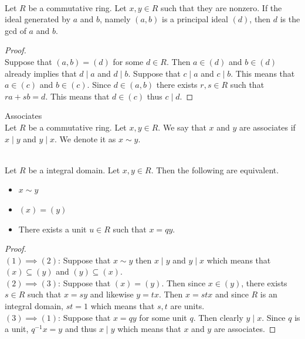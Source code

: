 \documentclass[a4paper]{article}
\begin{document}
\begin{prp}{}{}\\
Let $R$ be a commutative ring. Let $x,y\in R$ such that they are nonzero. If the ideal generated by $a$ and $b$, namely $(a,b)$ is a principal ideal $(d)$, then $d$ is the gcd of $a$ and $b$. 
\begin{proof}\\
Suppose that $(a,b)=(d)$ for some $d\in R$. Then $a\in(d)$ and $b\in(d)$ already implies that $d\;|\;a$ and $d\;|\;b$. Suppose that $c\;|\;a$ and $c\;|\;b$. This means that $a\in(c)$ and $b\in(c)$. Since $d\in(a,b)$ there exists $r,s\in R$ such that $ra+sb=d$. This means that $d\in(c)$ thus $c\;|\;d$. 
\end{proof}
\end{prp}

\begin{defn}{Associates}{}\\
Let $R$ be a commutative ring. Let $x,y\in R$. We say that $x$ and $y$ are associates if $x\;|\;y$ and $y\;|\;x$. We denote it as $x\sim y$. 
\end{defn}

\begin{prp}{}{}\\
Let $R$ be a integral domain. Let $x,y\in R$. Then the following are equivalent. 
\begin{itemize}
\item $x\sim y$
\item $(x)=(y)$
\item There exists a unit $u\in R$ such that $x=qy$. 
\end{itemize} 
\begin{proof}\\
$(1)\implies(2)$: Suppose that $x\sim y$ then $x\;|\;y$ and $y\;|\;x$ which means that $(x)\subseteq(y)$ and $(y)\subseteq(x)$. \\

$(2)\implies(3)$: Suppose that $(x)=(y)$. Then since $x\in(y)$, there exists $s\in R$ such that $x=sy$ and likewise $y=tx$. Then $x=stx$ and since $R$ is an integral domain, $st=1$ which means that $s,t$ are units. \\

$(3)\implies(1)$: Suppose that $x=qy$ for some unit $q$. Then clearly $y\;|\;x$. Since $q$ is a unit, $q^{-1}x=y$ and thus $x\;|\;y$ which means that $x$ and $y$ are associates. 
\end{proof}
\end{prp}
\end{document}
